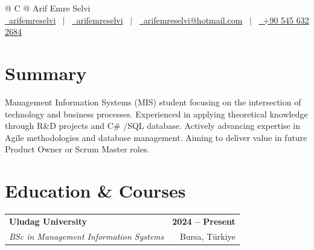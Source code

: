 \documentclass[a4paper,12pt]{article}
\begin{document}
\pagestyle{empty} 

\begin{tabularx}{\linewidth}{@{} C @{}}
\Huge{Arif Emre Selvi} \\[7.5pt]
\href{https://github.com/arifemreselvi}{\raisebox{-0.05\height}\faGithub\ arifemreselvi} \ $|$ \ 
\href{https://www.linkedin.com/in/arifemreselvi/}{\raisebox{-0.05\height}\faLinkedin\ arifemreselvi} \ $|$ \ 
\href{mailto:arifemreselvi@hotmail.com}{\raisebox{-0.05\height}\faEnvelope \ arifemreselvi@hotmail.com} \ $|$ \ 
\href{tel:+905456322684}{\raisebox{-0.05\height}\faMobile \ +90 545 632 2684} \\
\end{tabularx}

\vspace{10pt}

\section{Summary}
Management Information Systems (MIS) student focusing on the intersection of technology and business processes. Experienced in applying theoretical knowledge through R\&D projects and C\# /SQL database. Actively advancing expertise in Agile methodologies and database management. Aiming to deliver value in future Product Owner or Scrum Master roles.

\vspace{10pt}

\section{Education \& Courses}
\begin{tabularx}{\linewidth}{@{}X r@{}}   
\textbf{Uludag University} & \textbf{2024 -- Present} \\
\textit{BSc in Management Information Systems} & Bursa, Türkiye \\
\end{tabularx}
\end{document}
